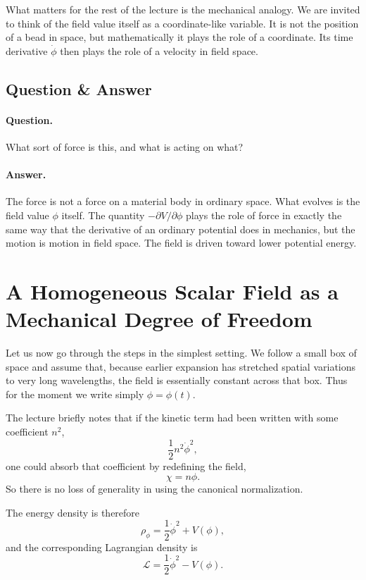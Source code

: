 What matters for the rest of the lecture is the mechanical analogy. We are invited to think of the field value itself as a coordinate-like variable. It is not the position of a bead in space, but mathematically it plays the role of a coordinate. Its time derivative \(\dot\phi\) then plays the role of a velocity in field space.

\subsection{Question \& Answer}

\paragraph{Question.} What sort of force is this, and what is acting on what?

\paragraph{Answer.} The force is not a force on a material body in ordinary space. What evolves is the field value \(\phi\) itself. The quantity \(-\partial V/\partial\phi\) plays the role of force in exactly the same way that the derivative of an ordinary potential does in mechanics, but the motion is motion in field space. The field is driven toward lower potential energy.

\section{A Homogeneous Scalar Field as a Mechanical Degree of Freedom}

Let us now go through the steps in the simplest setting. We follow a small box of space and assume that, because earlier expansion has stretched spatial variations to very long wavelengths, the field is essentially constant across that box. Thus for the moment we write simply \(\phi=\phi(t)\).

The lecture briefly notes that if the kinetic term had been written with some coefficient \(n^{2}\),
\[
\frac{1}{2}n^{2}\dot\phi^{2},
\]
one could absorb that coefficient by redefining the field,
\[
\chi=n\phi.
\]
So there is no loss of generality in using the canonical normalization.

The energy density is therefore
\begin{equation}
\rho_\phi=\frac{1}{2}\dot{\phi}^{2}+V(\phi),
\end{equation}
and the corresponding Lagrangian density is
\begin{equation}
\mathcal{L}=\frac{1}{2}\dot{\phi}^{2}-V(\phi).
\end{equation}


